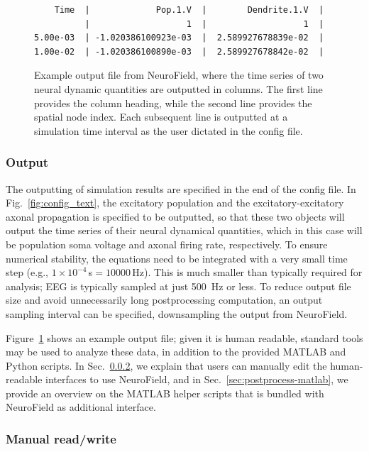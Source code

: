 \documentclass[preprint,review,10pt,authoryear,letterpaper]{elsarticle}
\begin{document}
\begin{figure}[th]
\begin{center}
\begin{lstlisting}
    Time  |             Pop.1.V  |        Dendrite.1.V  |
          |                   1  |                   1  |
5.00e-03  | -1.020386100923e-03  |  2.589927678839e-02  |
1.00e-02  | -1.020386100890e-03  |  2.589927678842e-02  |
\end{lstlisting}
\caption{Example output file from NeuroField, where the time series of two neural dynamic quantities are outputted in columns. The first line provides the column heading, while the second line provides the spatial node index. Each subsequent line is outputted at a simulation time interval as the user dictated in the config file.}
\label{fig:output_text}
\end{center}
\end{figure}

\subsubsection{Output}

The outputting of simulation results are specified in the end of the config file. In Fig.~\ref{fig:config_text}, the excitatory population and the excitatory-excitatory axonal propagation is specified to be outputted, so that these two objects will output the time series of their neural dynamical quantities, which in this case will be population soma voltage and axonal firing rate, respectively. To ensure numerical stability, the equations need to be integrated with a very small time step (e.g., $1\times10^{-4}$\,s$=10000$\,Hz). This is much smaller than typically required for analysis; EEG is typically sampled at just 500~Hz or less. To reduce output file size and avoid unnecessarily long postprocessing computation, an output sampling interval can be specified, downsampling the output from NeuroField.

Figure~\ref{fig:output_text} shows an example output file; given it is human readable, standard tools may be used to analyze these data, in addition to the provided MATLAB and Python scripts. In Sec.~\ref{sec:postprocess-manual}, we explain that users can manually edit the human-readable interfaces to use NeuroField, and in Sec.~\ref{sec:postprocess-matlab}, we provide an overview on the MATLAB helper scripts that is bundled with NeuroField as additional interface.

\subsubsection{Manual read/write}
\label{sec:postprocess-manual}
\end{document}
